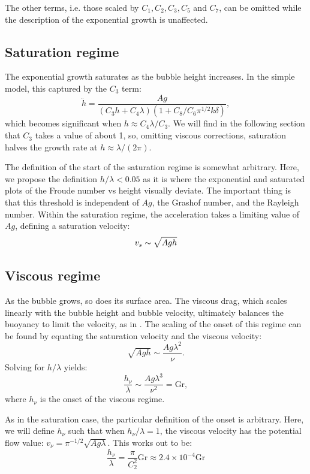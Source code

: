The other terms, i.e. those scaled by $C_1, C_2, C_3, C_5$ and $C_7$, can be omitted while the description of the exponential growth is unaffected.

\subsection{Saturation regime}
The exponential growth saturates as the bubble height increases.
In the simple model, this captured by the $C_3$ term:
\begin{equation}
\ddot{h} = \frac{A g}{(C_3 h + C_4 \lambda) (1 + C_8 / C_6 \pi^{1/2} k \delta)},
\end{equation}
which becomes significant when $h \approx C_4 \lambda / C_3$.
We will find in the following section that $C_3$ takes a value of about 1, so, omitting viscous corrections, saturation halves the growth rate at $h \approx \lambda / (2\pi)$.

The definition of the start of the saturation regime is somewhat arbitrary.
Here, we propose the definition $h/\lambda < 0.05$ as it is where the exponential and saturated plots of the Froude number vs height visually deviate.
The important thing is that this threshold is independent of $Ag$, the Grashof number, and the Rayleigh number.
Within the saturation regime, the acceleration takes a limiting value of $Ag$, defining a saturation velocity:
\begin{equation} \elabel{vel_sat}
v_s \sim \sqrt{A g h}
\end{equation}

\subsection{Viscous regime}
As the bubble grows, so does its surface area.
The viscous drag, which scales linearly with the bubble height and bubble velocity, ultimately balances the buoyancy to limit the velocity, as in .
The scaling of the onset of this regime can be found by equating the saturation velocity and the viscous velocity:
\begin{equation}
\sqrt{A g h} \sim \frac{A g \lambda^2}{\nu}.
\end{equation}
Solving for $h/\lambda$ yields:
\begin{equation}
\frac{h_\nu}{\lambda} \sim \frac{A g \lambda^3}{\nu^2} = \text{Gr},
\end{equation}
where $h_\nu$ is the onset of the viscous regime.

As in the saturation case, the particular definition of the onset is arbitrary.
Here, we will define $h_\nu$ such that when $h_\nu/\lambda = 1$, the viscous velocity has the potential flow value: $v_\nu = \pi^{-1/2} \sqrt{A g \lambda}$.
This works out to be:
\begin{equation}
\frac{h_\nu}{\lambda} = \frac{\pi}{C_2^2} \text{Gr} \approx 2.4 \times 10^{-4} \text{Gr}
\end{equation}

